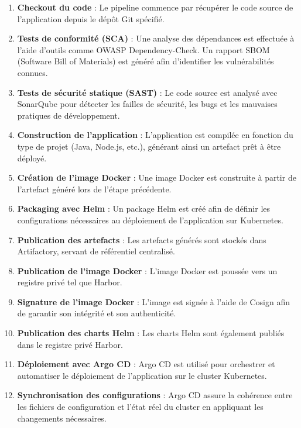 \begin{enumerate}
    \item \textbf{Checkout du code} :  
    Le pipeline commence par récupérer le code source de l’application depuis le dépôt Git spécifié.

    \item \textbf{Tests de conformité (SCA)} :  
    Une analyse des dépendances est effectuée à l’aide d’outils comme OWASP Dependency-Check. Un rapport SBOM (Software Bill of Materials) est généré afin d’identifier les vulnérabilités connues.

    \item \textbf{Tests de sécurité statique (SAST)} :  
    Le code source est analysé avec SonarQube pour détecter les failles de sécurité, les bugs et les mauvaises pratiques de développement.

    \item \textbf{Construction de l’application} :  
    L’application est compilée en fonction du type de projet (Java, Node.js, etc.), générant ainsi un artefact prêt à être déployé.

    \item \textbf{Création de l’image Docker} :  
    Une image Docker est construite à partir de l’artefact généré lors de l’étape précédente.

    \item \textbf{Packaging avec Helm} :  
    Un package Helm est créé afin de définir les configurations nécessaires au déploiement de l’application sur Kubernetes.

    \item \textbf{Publication des artefacts} :  
    Les artefacts générés sont stockés dans Artifactory, servant de référentiel centralisé.

    \item \textbf{Publication de l’image Docker} :  
    L’image Docker est poussée vers un registre privé tel que Harbor.

    \item \textbf{Signature de l’image Docker} :  
    L’image est signée à l’aide de Cosign afin de garantir son intégrité et son authenticité.

    \item \textbf{Publication des charts Helm} :  
    Les charts Helm sont également publiés dans le registre privé Harbor.

    \item \textbf{Déploiement avec Argo CD} :  
    Argo CD est utilisé pour orchestrer et automatiser le déploiement de l’application sur le cluster Kubernetes.

    \item \textbf{Synchronisation des configurations} :  
    Argo CD assure la cohérence entre les fichiers de configuration et l’état réel du cluster en appliquant les changements nécessaires.

\end{enumerate}

